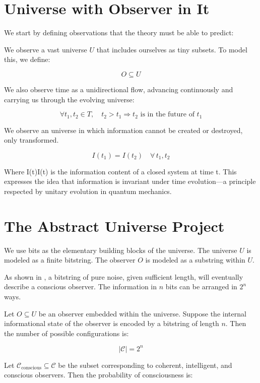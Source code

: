 \documentclass[11pt]{article}
\begin{document}



\section{Universe with Observer in It}

We start by defining observations that the theory must be able to predict:

We observe a vast universe \( U \) that includes ourselves as tiny subsets. To model this, we define:

\[
      O \subseteq U
\]

We also observe time as a unidirectional flow, advancing continuously and carrying us through the evolving universe:

\[
      \forall t_1, t_2 \in T,\quad t_2 > t_1 \Rightarrow t_2 \text{ is in the future of } t_1
\]

We observe an universe in which information cannot be created or destroyed, only transformed.

\[
      I(t_1) = I(t_2) \quad \forall \, t_1, t_2
\]

Where I(t)I(t) is the information content of a closed system at time t. This expresses the idea that information is invariant under time evolution—a principle respected by unitary evolution in quantum mechanics.





\section{The Abstract Universe Project}

We use bits as the elementary building blocks of the universe. The universe \(U\) is modeled as a finite bitstring. The observer \(O\) is modeled as a substring within \(U\).

As shown in \cite{meskanen2008}, a bitstring of pure noise, given sufficient length, will eventually describe a conscious observer. The information in \(n\) bits can be arranged in \(2^n\) ways.

Let \(O \subseteq U\) be an observer embedded within the universe. Suppose the internal informational state of the observer is encoded by a bitstring of length \(n\). Then the number of possible configurations is:

\[
      |\mathcal{C}| = 2^n
\]

Let \(\mathcal{C}_{\text{conscious}} \subseteq \mathcal{C}\) be the subset corresponding to coherent, intelligent, and conscious observers. Then the probability of consciousness is:
\end{document}

